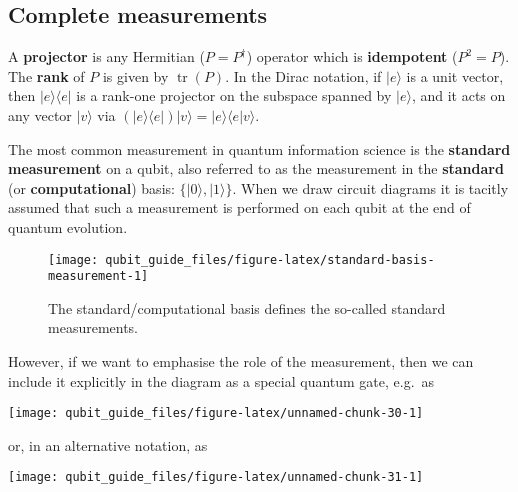 \documentclass[fleqn]{article}
\newenvironment{idea}{\noindent}{\medskip}
\begin{document}
\hypertarget{complete-measurements}{%
\subsection{Complete measurements}\label{complete-measurements}}

\begin{idea}
A \textbf{projector} is any Hermitian (\(P=P^\dagger\)) operator which is \textbf{idempotent} (\(P^2=P\)).
The \textbf{rank} of \(P\) is given by \(\operatorname{tr}(P)\).
In the Dirac notation, if \(|e\rangle\) is a unit vector, then \(|e\rangle\langle e|\) is a rank-one projector on the subspace spanned by \(|e\rangle\), and it acts on any vector \(|v\rangle\) via \((|e\rangle\langle e|)|v\rangle = |e\rangle\langle e|v\rangle\).

\end{idea}

The most common measurement in quantum information science is the \textbf{standard measurement} on a qubit, also referred to as the measurement in the \textbf{standard} (or \textbf{computational}) basis: \(\{|0\rangle,|1\rangle\}\).
When we draw circuit diagrams it is tacitly assumed that such a measurement is performed on each qubit at the end of quantum evolution.

\begin{figure}[H]

{\centering \texttt{[image: qubit\_guide\_files/figure-latex/standard-basis-measurement-1]} 

}

\caption{The standard/computational basis defines the so-called standard measurements.}\label{fig:standard-basis-measurement}
\end{figure}

However, if we want to emphasise the role of the measurement, then we can include it explicitly in the diagram as a special quantum gate, e.g.~as

\begin{center}\texttt{[image: qubit\_guide\_files/figure-latex/unnamed-chunk-30-1]} \end{center}

or, in an alternative notation, as

\begin{center}\texttt{[image: qubit\_guide\_files/figure-latex/unnamed-chunk-31-1]} \end{center}
\end{document}
